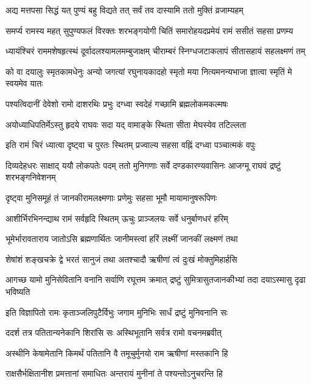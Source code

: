 \twolineshloka
{अद्य मत्तपसा सिद्धं यत् पुण्यं बहु विद्यते}
{तत् सर्वं तव दास्यामि ततो मुक्तिं व्रजाम्यहम्} %

\fourlineindentedshloka
{समर्प्य रामस्य महत् सुपुण्यफलं}
{विरक्तः शरभङ्गयोगी}
{चितिं समारोहयदप्रमेयं}
{रामं ससीतं सहसा प्रणम्य} %

\fourlineindentedshloka
{ध्यायंश्चिरं राममशेषहृत्स्थं}
{दूर्वादलश्यामलमम्बुजाक्षम्}
{चीराम्बरं स्निग्धजटाकलापं}
{सीतासहायं सहलक्ष्मणं तम्} %

\fourlineindentedshloka
{को वा दयालुः स्मृतकामधेनुः}
{अन्यो जगत्यां रघुनायकादहो}
{स्मृतो मया नित्यमनन्यभाजा}
{ज्ञात्वा स्मृतिं मे स्वयमेव यातः} %

\twolineshloka
{पश्यत्विदानीं देवेशो रामो दाशरथिः प्रभुः}
{दग्ध्वा स्वदेहं गच्छामि ब्रह्मलोकमकल्मषः} %

\twolineshloka
{अयोध्याधिपतिर्मेऽस्तु हृदये राघवः सदा}
{यद् वामाङ्के स्थिता सीता मेघस्येव तटिल्लता} %

\twolineshloka
{इति रामं चिरं ध्यात्वा दृष्ट्वा च पुरतः स्थितम्}
{प्रज्वाल्य सहसा वह्निं दग्ध्वा पञ्चात्मकं वपुः} %

\threelineshloka
{दिव्यदेहधरः साक्षाद् ययौ लोकपतेः पदम्}
{ततो मुनिगणाः सर्वे दण्डकारण्यवासिनः}
{आजग्मू राघवं द्रष्टुं शरभङ्गनिवेशनम्} %

\twolineshloka
{दृष्ट्वा मुनिसमूहं तं जानकीरामलक्ष्मणाः}
{प्रणेमुः सहसा भूमौ मायामानुषरूपिणः} %

\twolineshloka
{आशीर्भिरभिनन्द्याथ रामं सर्वहृदि स्थितम्}
{ऊचुः प्राञ्जलयः सर्वे धनुर्बाणधरं हरिम्} %

\twolineshloka
{भूमेर्भारावताराय जातोऽसि ब्रह्मणार्थितः}
{जानीमस्त्वां हरिं लक्ष्मीं जानकीं लक्ष्मणं तथा} %

\twolineshloka
{शेषांशं शङ्खचक्रे द्वे भरतं सानुजं तथा}
{अतश्चादौ ऋषीणां त्वं दुःखं मोक्तुमिहार्हसि} %

\fourlineindentedshloka
{आगच्छ यामो मुनिसेवितानि}
{वनानि सर्वाणि रघूत्तम क्रमात्}
{द्रष्टुं सुमित्रासुतजानकीभ्यां}
{तदा दयाऽस्मासु दृढा भविष्यति} %

\twolineshloka
{इति विज्ञापितो रामः कृताञ्जलिपुटैर्विभुः}
{जगाम मुनिभिः सार्धं द्रष्टुं मुनिवनानि सः} %

\twolineshloka
{ददर्श तत्र पतितान्यनेकानि शिरांसि सः}
{अस्थिभूतानि सर्वत्र रामो वचनमब्रवीत्} %

\twolineshloka
{अस्थीनि केषामेतानि किमर्थं पतितानि वै}
{तमूचुर्मुनयो राम ऋषीणां मस्तकानि हि} %

\twolineshloka
{राक्षसैर्भक्षितानीश प्रमत्तानां समाधितः}
{अन्तरायं मुनीनां ते पश्यन्तोऽनुचरन्ति हि} %

